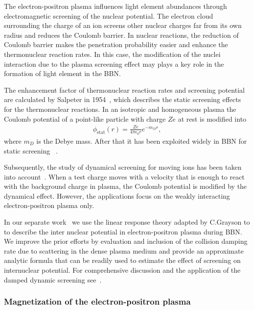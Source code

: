 The electron-positron plasma influences light element abundances through electromagnetic screening of the nuclear potential. The electron cloud surrounding the charge of an ion screens other nuclear charges far from its own radius and reduces the Coulomb barrier. In nuclear reactions, the reduction of Coulomb barrier makes the penetration probability easier and enhance the thermonuclear reaction rates. In this case, the modification of the nuclei interaction due to the plasma screening effect may plays a key role in the formation of light element in the BBN. 

The enhancement factor of thermonuclear reaction rates and screening potential are calculated by Salpeter in 1954~\cite{Salpeter:1954nc}, which describes the static screening effects for the thermonuclear reactions. In an isotropic and homogeneous plasma the Coulomb potential of a point-like particle with charge $Ze$ at rest is modified into~\cite{Salpeter:1954nc}
\begin{align}
\phi_\text{stat}(r)=\frac{Ze}{4\pi\epsilon_0 r}e^{-m_Dr},
\end{align}
where $m_D$ is the Debye mass. After that it has been exploited widely in BBN for static screening ~\cite{1969ApJ...155..183S,Famiano:2016hhs}. 

Subsequently, the study of dynamical screening for moving ions has been taken into account~\cite{1988ApJ...331..565C,Gruzinov:1997as,Hwang:2021kno}. When a test charge moves with a velocity that is enough to react with the background charge in plasma, the Coulomb potential is modified by the dynamical effect. However, the applications focus on the weakly interacting electron-positron plasma only. 

In our separate work~\cite{Grayson:2023flr} we use the linear response theory adapted by C.Grayson to to describe the inter nuclear potential in electron-positron plasma during BBN. We improve the prior efforts by evaluation and inclusion of the collision damping rate due to scattering in the dense plasma medium and provide an approximate analytic formula that can be readily used to estimate the effect of screening on internuclear potential. For comprehensive discussion and the application of the damped dynamic screening see~\cite{Grayson:2023flr}.










\subsubsection{Magnetization of the electron-positron plasma}

